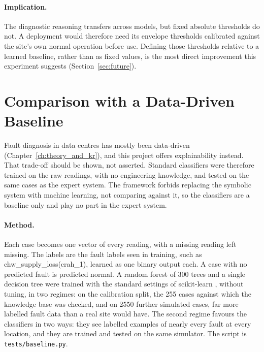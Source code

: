 \paragraph{Implication.} The diagnostic reasoning transfers across models, but fixed absolute thresholds do not. A deployment would therefore need its envelope thresholds calibrated against the site's own normal operation before use. Defining those thresholds relative to a learned baseline, rather than as fixed values, is the most direct improvement this experiment suggests (Section~\ref{sec:future}).

\section{Comparison with a Data-Driven Baseline}
\label{sec:baseline}

Fault diagnosis in data centres has mostly been data-driven (Chapter~\ref{ch:theory_and_kr}), and this project offers explainability instead. That trade-off should be shown, not asserted. Standard classifiers were therefore trained on the raw readings, with no engineering knowledge, and tested on the same cases as the expert system. The framework forbids replacing the symbolic system with machine learning, not comparing against it, so the classifiers are a baseline only and play no part in the expert system.

\paragraph{Method.} Each case becomes one vector of every reading, with a missing reading left missing. The labels are the fault labels seen in training, such as chw\_supply\_loss(crah\_1), learned as one binary output each. A case with no predicted fault is predicted normal. A random forest of 300 trees and a single decision tree were trained with the standard settings of scikit-learn \parencite{pedregosa2011}, without tuning, in two regimes: on the calibration split, the 255 cases against which the knowledge base was checked, and on 2550 further simulated cases, far more labelled fault data than a real site would have. The second regime favours the classifiers in two ways: they see labelled examples of nearly every fault at every location, and they are trained and tested on the same simulator. The script is \texttt{tests/baseline.py}.




